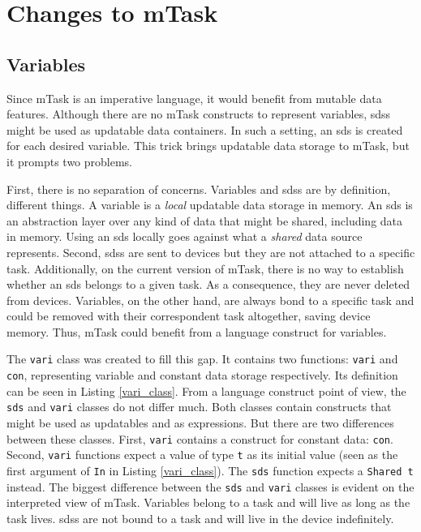 
\section{Changes to mTask}
\subsection{Variables}

Since \gls{mTask} is an imperative language, it would benefit from mutable data features. Although there are no \gls{mTask} constructs to represent variables, \acp{sds} might be used as updatable data containers. In such a setting, an \ac{sds} is created for each desired variable. This trick brings updatable data storage to \gls{mTask}, but it prompts two problems. 

First, there is no separation of concerns. Variables and \acp{sds} are by definition, different things. A variable is a \textit{local} updatable data storage in memory. An \ac{sds} is an abstraction layer over any kind of data that might be shared, including data in memory. Using an \ac{sds} locally goes against what a \textit{shared} data source represents. Second, \acp{sds} are sent to devices but they are not attached to a specific task. Additionally, on the current version of mTask, there is no way to establish whether an \ac{sds} belongs to a given task. As a consequence, they are never deleted from devices. Variables, on the other hand, are always bond to a specific task and could be removed with their correspondent task altogether, saving device memory. Thus, \gls{mTask} could benefit from a language construct for variables. 

The \texttt{vari} class was created to fill this gap. It contains two functions: \texttt{vari} and \texttt{con}, representing variable and constant data storage respectively. Its definition can be seen in Listing \ref{vari_class}. From a language construct point of view, the \texttt{sds} and \texttt{vari} classes do not differ much. Both classes contain constructs that might be used as updatables and as expressions. But there are two differences between these classes. First, \texttt{vari} contains a construct for constant data: \texttt{con}. Second, \texttt{vari} functions expect a value of type \texttt{t} as its initial value (seen as the first argument of \texttt{In} in Listing \ref{vari_class}). The \texttt{sds} function expects a \texttt{Shared t} instead. The biggest difference between the \texttt{sds} and \texttt{vari} classes is evident on the interpreted view of \gls{mTask}. Variables belong to a task and will live as long as the task lives. \acp{sds} are not bound to a task and will live in the device indefinitely. 


